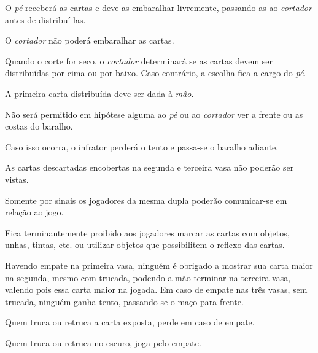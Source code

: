 \begin{article}
	O \textit{pé} receberá as cartas e deve as embaralhar livremente, passando-as ao \textit{cortador} antes de distribuí-las.

	\begin{xparagraph}
		O \textit{cortador} não poderá embaralhar as cartas.
	\end{xparagraph}

	\begin{xparagraph}
		Quando o corte for seco, o \textit{cortador} determinará se as cartas devem ser distribuídas por cima ou por baixo. Caso contrário, a escolha fica a cargo do \textit{pé}.
	\end{xparagraph}

	\begin{xparagraph}
		A primeira carta distribuída deve ser dada à \textit{mão}.
	\end{xparagraph}
\end{article}

\begin{article}
	Não será permitido em hipótese alguma ao \textit{pé} ou ao \textit{cortador} ver a frente ou as costas do baralho.

	\begin{xparagraph}
		Caso isso ocorra, o infrator perderá o tento e passa-se o baralho adiante.
	\end{xparagraph}
\end{article}

\begin{article}
	As cartas descartadas encobertas na segunda e terceira vasa não poderão ser vistas.
\end{article}

\begin{article}
	Somente por sinais os jogadores da mesma dupla poderão comunicar-se em relação ao jogo.

	\begin{xparagraph}
		Fica terminantemente proibido aos jogadores marcar as cartas com objetos, unhas, tintas, etc. ou utilizar objetos que possibilitem o reflexo das cartas.
	\end{xparagraph}
\end{article}

\begin{article}
	Havendo empate na primeira vasa, ninguém é obrigado a mostrar sua carta maior na segunda, mesmo com trucada, podendo a mão terminar na terceira vasa, valendo pois essa carta maior na jogada. Em caso de empate nas três vasas, sem trucada, ninguém ganha tento, passando-se o maço para frente.

	\begin{xparagraph}
		Quem truca ou retruca a carta exposta, perde em caso de empate.
	\end{xparagraph}

	\begin{xparagraph}
		Quem truca ou retruca no escuro, joga pelo empate.
	\end{xparagraph}
\end{article}

